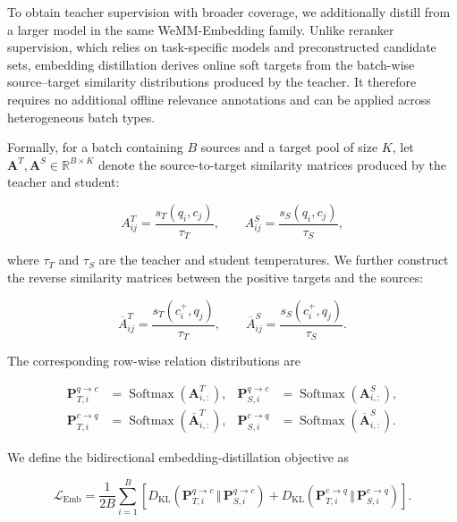 \documentclass[]{wechat}
\begin{document}
To obtain teacher supervision with broader coverage, we additionally distill from a larger model in the same WeMM-Embedding family. Unlike reranker supervision, which relies on task-specific models and preconstructed candidate sets, embedding distillation derives online soft targets from the batch-wise source--target similarity distributions produced by the teacher. It therefore requires no additional offline relevance annotations and can be applied across heterogeneous batch types.

Formally, for a batch containing $B$ sources and a target pool of size $K$, let $\mathbf{A}^{T},\mathbf{A}^{S}\in\mathbb{R}^{B\times K}$ denote the source-to-target similarity matrices produced by the teacher and student:

\begin{equation}
    A^{T}_{ij}
    =
    \frac{s_T(q_i,c_j)}{\tau_T},
    \qquad
    A^{S}_{ij}
    =
    \frac{s_S(q_i,c_j)}{\tau_S},
    \label{eq:source_target_similarity}
\end{equation}

where $\tau_T$ and $\tau_S$ are the teacher and student temperatures. We further construct the reverse similarity matrices between the positive targets and the sources:

\begin{equation}
    \overline{A}^{T}_{ij}
    =
    \frac{s_T(c_i^{+},q_j)}{\tau_T},
    \qquad
    \overline{A}^{S}_{ij}
    =
    \frac{s_S(c_i^{+},q_j)}{\tau_S}.
    \label{eq:target_source_similarity}
\end{equation}

The corresponding row-wise relation distributions are

\begin{align}
    \mathbf{P}_{T,i}^{q\rightarrow c}
    &=
    \operatorname{Softmax}
    \left(
        \mathbf{A}^{T}_{i,:}
    \right),
    &
    \mathbf{P}_{S,i}^{q\rightarrow c}
    &=
    \operatorname{Softmax}
    \left(
        \mathbf{A}^{S}_{i,:}
    \right),
    \\
    \mathbf{P}_{T,i}^{c\rightarrow q}
    &=
    \operatorname{Softmax}
    \left(
        \overline{\mathbf{A}}^{T}_{i,:}
    \right),
    &
    \mathbf{P}_{S,i}^{c\rightarrow q}
    &=
    \operatorname{Softmax}
    \left(
        \overline{\mathbf{A}}^{S}_{i,:}
    \right).
\end{align}

We define the bidirectional embedding-distillation objective as

\begin{equation}
    \mathcal{L}_{\mathrm{Emb}}
    =
    \frac{1}{2B}
    \sum_{i=1}^{B}
    \left[
        D_{\mathrm{KL}}
        \left(
            \mathbf{P}_{T,i}^{q\rightarrow c}
            \,\Vert\,
            \mathbf{P}_{S,i}^{q\rightarrow c}
        \right)
        +
        D_{\mathrm{KL}}
        \left(
            \mathbf{P}_{T,i}^{c\rightarrow q}
            \,\Vert\,
            \mathbf{P}_{S,i}^{c\rightarrow q}
        \right)
    \right].
    \label{eq:embedding_distillation}
\end{equation}
\end{document}
